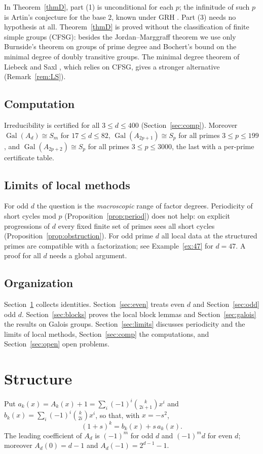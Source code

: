 \documentclass[11pt]{amsart}
\theoremstyle{definition}\newtheorem{definition}[theorem]{Definition}\newtheorem{example}[theorem]{Example}
\theoremstyle{remark}\newtheorem{remark}[theorem]{Remark}
\newcommand{\Gal}{\operatorname{Gal}}\newcommand{\disc}{\operatorname{disc}}\newcommand{\Res}{\operatorname{Res}}
\begin{document}
In Theorem~\ref{thmD}, part (1) is unconditional for each $p$; the infinitude of such $p$ is Artin's conjecture for the base $2$, known under GRH \cite{Hooley}.
Part (3) needs no hypothesis at all. Theorem~\ref{thmD} is proved without the classification of finite simple groups (CFSG): besides the
Jordan--Marggraff theorem we use only Burnside's theorem on groups of prime degree and Bochert's bound on the minimal degree of doubly transitive
groups. The minimal degree theorem of Liebeck and Saxl \cite{LS}, which relies on CFSG, gives a stronger alternative (Remark~\ref{rem:LS}).

\subsection*{Computation}
Irreducibility is certified for all $3\le d\le400$ (Section~\ref{sec:comp}). Moreover $\Gal(A_d)\cong S_m$ for $17\le d\le82$,
$\Gal(A_{2p+1})\cong S_p$ for all primes $3\le p\le199$, and $\Gal(A_{2p+2})\cong S_p$ for all primes $3\le p\le3000$, the last with a
per-prime certificate table.

\subsection*{Limits of local methods}
For odd $d$ the question is the \emph{macroscopic} range of factor degrees. Periodicity of short cycles mod $p$ (Proposition~\ref{prop:period})
does not help: on explicit progressions of $d$ every fixed finite set of primes sees all short cycles (Proposition~\ref{prop:obstruction}).
For odd prime $d$ all local data at the structured primes are compatible with a factorization; see Example~\ref{ex:47} for $d=47$.
A proof for all $d$ needs a global argument.

\subsection*{Organization}
Section~\ref{sec:struct} collects identities. Section~\ref{sec:even} treats even $d$ and Section~\ref{sec:odd} odd $d$. Section~\ref{sec:blocks}
proves the local block lemmas and Section~\ref{sec:galois} the results on Galois groups. Section~\ref{sec:limits} discusses periodicity and the
limits of local methods, Section~\ref{sec:comp} the computations, and Section~\ref{sec:open} open problems.

\section{Structure}\label{sec:struct}
Put $a_k(x)=A_k(x)+1=\sum_i(-1)^i\binom k{2i+1}x^i$ and $b_k(x)=\sum_i(-1)^i\binom k{2i}x^i$, so that, with $x=-s^2$,
\begin{equation}\label{eq:ab}
(1+s)^k=b_k(x)+s\,a_k(x).
\end{equation}
The leading coefficient of $A_d$ is $(-1)^m$ for odd $d$ and $(-1)^md$ for even $d$; moreover $A_d(0)=d-1$ and $A_d(-1)=2^{d-1}-1$.
\end{document}
